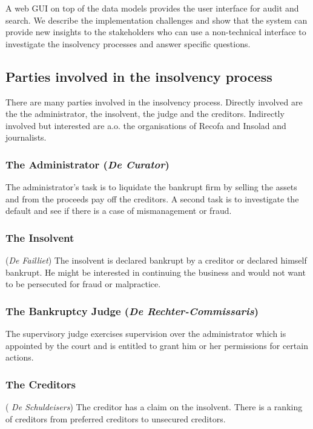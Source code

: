 A web GUI on top of the data models provides the user interface for audit and search. We describe the implementation challenges and show that the system can provide new insights to the stakeholders who can use a non-technical interface to investigate the insolvency processes and answer specific questions. 

\subsection{Parties involved in the insolvency process}
There are many parties involved in the insolvency process. Directly involved are the the administrator, the insolvent, the judge and the creditors. Indirectly involved but interested are a.o. the organisations of Recofa and Insolad and journalists. 

\subsubsection{The Administrator (\textit{De Curator})}
The administrator's task is to liquidate the bankrupt firm by selling the assets and from the proceeds pay off the creditors. A second task is to investigate the default and see if there is a case of mismanagement or fraud.

\subsubsection{The Insolvent} (\textit{De Failliet})
The insolvent is declared bankrupt by a creditor or declared himself bankrupt. He might be interested in continuing the business and would not want to be persecuted for fraud or malpractice.

\subsubsection{The Bankruptcy Judge (\textit{De Rechter-Commissaris})}
The supervisory judge exercises supervision over the administrator which is appointed by the court and is entitled to grant him or her permissions for certain actions.

\subsubsection{The Creditors}( \textit{De Schuldeisers})
The creditor has a claim on the insolvent. There is a ranking of creditors from preferred creditors to unsecured creditors.

